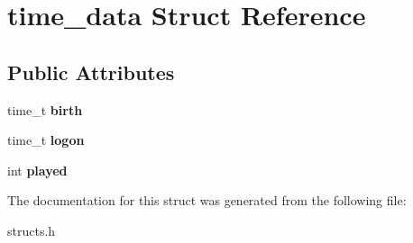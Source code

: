 \hypertarget{structtime__data}{}\section{time\+\_\+data Struct Reference}
\label{structtime__data}
\subsection*{Public Attributes}
\begin{DoxyCompactItemize}
\item 
\mbox{\label{structtime__data_a335b9731cbcfad50a9492f732cd62d64}} 
time\+\_\+t {\bfseries birth}
\item 
\mbox{\label{structtime__data_a74a114e6be3ccb5a8852ae8b7e19e995}} 
time\+\_\+t {\bfseries logon}
\item 
\mbox{\label{structtime__data_a52ce2ac236ba97cf718f9ecfdd7bf410}} 
int {\bfseries played}
\end{DoxyCompactItemize}


The documentation for this struct was generated from the following file\+:\begin{DoxyCompactItemize}
\item 
structs.\+h\end{DoxyCompactItemize}
